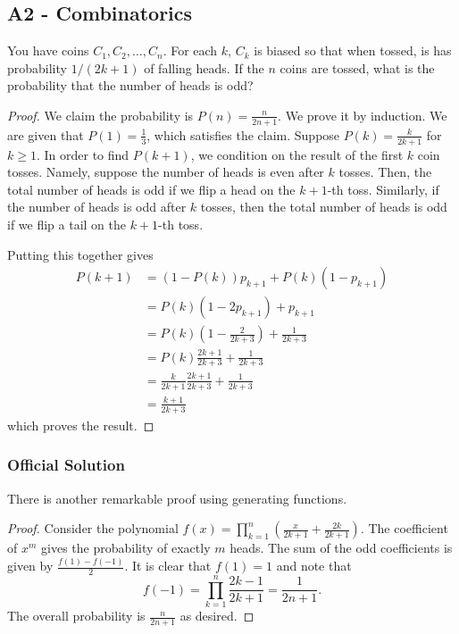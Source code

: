 \documentclass[11pt]{scrartcl}
\newcommand{\<}{\langle}
\renewcommand{\>}{\rangle}
\begin{document}
\subsection{A2 - Combinatorics}
You have coins $C_1, C_2, \dots, C_n$.  For each $k$, $C_k$ is biased so that when tossed, is has probability $1/(2k+1)$ of falling heads.  If the $n$ coins are tossed, what is the probability that the number of heads is odd?

\begin{proof}
We claim the probability is $P(n) = \boxed{\frac{n}{2n+1}}$.  We prove it by induction.  We are given that $P(1) = \frac{1}{3}$, which satisfies the claim.  Suppose $P(k) = \frac{k}{2k+1}$ for $k \ge 1$.  In order to find $P(k+1)$, we condition on the result of the first $k$ coin tosses.  Namely, suppose the number of heads is even after $k$ tosses.  Then, the total number of heads is odd if we flip a head on the $k+1$-th toss.  Similarly, if the number of heads is odd after $k$ tosses, then the total number of heads is odd if we flip a tail on the $k+1$-th toss.  

Putting this together gives 
\begin{align*}
P(k+1) &= (1 - P(k))p_{k+1} + P(k)(1 - p_{k+1}) \\
&= P(k)\left (1 - 2p_{k+1}\right ) + p_{k+1} \\
&= P(k) \left (1 - \frac{2}{2k+3}\right ) + \frac{1}{2k+3} \\
&= P(k) \frac{2k+1}{2k+3} + \frac{1}{2k+3} \\
&= \frac{k}{2k+1} \frac{2k+1}{2k+3} + \frac{1}{2k+3} \\
&=\frac{k+1}{2k+3}
\end{align*}
which proves the result.
\end{proof}

\subsubsection{Official Solution}
There is another remarkable proof using generating functions.
\begin{proof}
Consider the polynomial $f(x) = \prod_{k=1}^n \left (\frac{x}{2k+1} + \frac{2k}{2k+1} \right)$.  The coefficient of $x^m$ gives the probability of exactly $m$ heads.  The sum of the odd coefficients is given by $\frac{f(1) - f(-1)}{2}$.  It is clear that $f(1) = 1$ and note that 
$$f(-1) = \prod_{k=1}^n \frac{2k-1}{2k+1} = \frac{1}{2n+1}.$$
The overall probability is $\frac{n}{2n+1}$ as desired.
\end{proof}
\pagebreak
\end{document}
